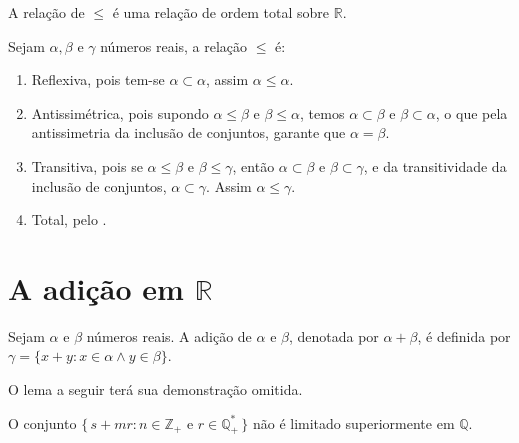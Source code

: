 \documentclass[../main.tex]{subfiles}
\begin{document}
\begin{teo}\label{reais-teo-ordemTotal}
    A relação de $\leq$ é uma relação de ordem total sobre $\mathbb{R}$.
\end{teo}
\begin{dem}
    Sejam $\alpha, \beta$ e $\gamma$ números reais, a relação $\leq$ é:
    \begin{enumerate}[label=(\roman*)]
        \item Reflexiva, pois tem-se $\alpha \subset \alpha$, assim $\alpha \leq \alpha$.
        \item Antissimétrica, pois supondo $\alpha \leq \beta$ e $\beta \leq \alpha$, temos $\alpha \subset \beta$ e $\beta \subset \alpha$, o que pela antissimetria da inclusão de conjuntos, garante que $\alpha = \beta$.
        \item Transitiva, pois se $\alpha \leq \beta$ e $\beta \leq \gamma$, então $\alpha \subset \beta$ e $\beta \subset \gamma$, e da transitividade da inclusão de conjuntos, $\alpha \subset \gamma$. Assim $\alpha \leq \gamma$.
        \item Total, pelo .
    \end{enumerate}
\end{dem}

\section{A adição em $\mathbb{R}$}
\begin{defi}\label{reais-def-adicao}
    Sejam $\alpha$ e $\beta$ números reais. A adição de $\alpha$ e $\beta$, denotada por $\alpha + \beta$, é definida por $\gamma = \{ x + y : x \in \alpha \land y \in \beta \}$.
\end{defi}

O lema a seguir terá sua demonstração omitida.
\begin{lema}
    O conjunto $\{\,s + mr : n \in \mathbb{Z}_{+} \text{ e } r \in \mathbb{Q}_{+}^* \,\}$ não é limitado superiormente em $\mathbb{Q}$.
\end{lema}
\end{document}
